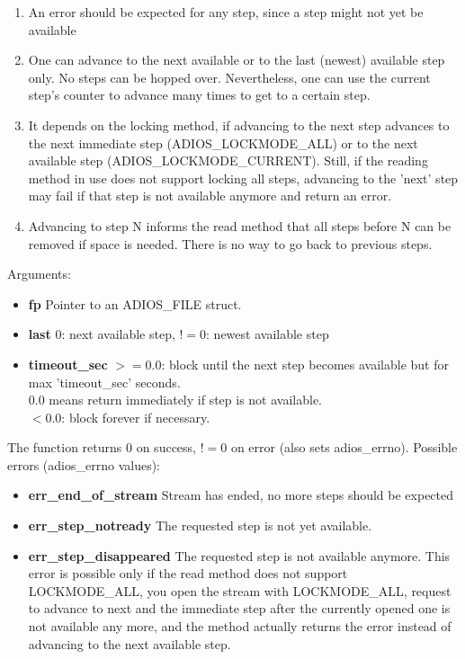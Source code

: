 \begin{enumerate}
\item An error should be expected for any step, since a step might not yet be available 

\item One can advance to the next available or to the last (newest) available step only. 
No steps can be hopped over. Nevertheless, one can use the current step's counter to advance 
many times to get to a certain step. 

\item It depends on the locking method, if advancing to the next step advances to the next
immediate step (ADIOS\_LOCKMODE\_ALL) or to the next available step (ADIOS\_LOCKMODE\_CURRENT). 
Still, if the reading method in use does not support locking all steps, advancing to the 'next' step may fail 
if that step is not available anymore and return an error. 

\item Advancing to step N informs the read method that all steps 
before N can be removed if space is needed. There is no way to go back to previous steps.
\end{enumerate}

\noindent Arguments:
\begin{itemize}
\item{\bf fp}       Pointer to an ADIOS\_FILE struct.
\item{\bf last}     $0$: next available step, $!=0$: newest available step 
 \item{\bf timeout\_sec}  $>=0.0$: block until the next step becomes available but 
for max 'timeout\_sec' seconds.\\
$0.0$ means return immediately if step is not available.\\
$<0.0$: block forever if necessary.
\end{itemize}

\noindent The function returns 0 on success, $!=0$ on error (also sets adios\_errno).
Possible errors (adios\_errno values):

\begin{itemize}
\item{\bf err\_end\_of\_stream}    Stream has ended, no more steps should be expected

\item{\bf err\_step\_notready}    The requested step is not yet available.

\item{\bf err\_step\_disappeared} The requested step is not available anymore. This error is possible only if the read method does not support LOCKMODE\_ALL, you open the stream with LOCKMODE\_ALL, request to advance to next and the immediate step after the currently opened one is not available any more, and the method actually returns the error instead of advancing to the next available step. 
\end{itemize}


